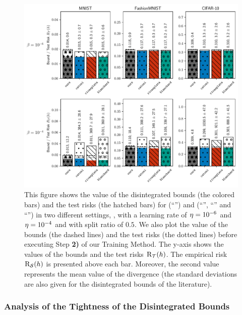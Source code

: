 \begin{figure}[!ht]
    \centering
    \includegraphics[width=1.0\linewidth]{chapter_6/figures/plot_3_prior_0.5_var_0.001.pdf}
    \caption[Comparison of the Disintegrated Bounds and the Test Risks]{
    This figure shows the value of the disintegrated bounds (the colored bars) and the test risks (the hatched bars) for  (``\algoours'') and  (``\algocatoni'', ``\algorivasplata'' and ``\algoblanchard'') in two different settings, \ie, with a learning rate of $\eta=10^{-6}$ and $\eta=10^{-4}$ and with split ratio of $0.5$.
    We also plot the value of the bounds (the dashed lines) and the test risks (the dotted lines) before executing Step {\bf 2)} of our Training Method.
    The y-axis shows the values of the bounds and the test risks $\text{R}_{\mathcal{T}}(h)$.
    The empirical risk $\text{R}_{\mathcal{S}}(h)$ is presented above each bar.
    Moreover, the second value represents the mean value of the divergence (the standard deviations are also given for the disintegrated bounds of the literature).
    }
    \label{chap:dis-pra:figure:exp-1}
\end{figure}

\subsubsection{Analysis of  the Tightness of the Disintegrated Bounds}

